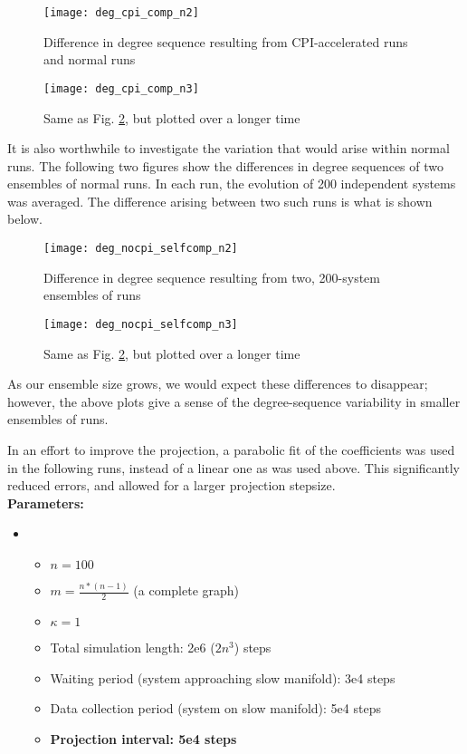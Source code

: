 \documentclass[11pt]{article}
\begin{document}
\begin{figure}[!h]
  \texttt{[image: deg\_cpi\_comp\_n2]}
  \caption{Difference in degree sequence resulting from CPI-accelerated runs and normal runs}
  \label{fig:degcomp_n2}
\end{figure}

\begin{figure}[!h]
  \texttt{[image: deg\_cpi\_comp\_n3]}
  \caption{Same as Fig. \ref{fig:degcomp_n2}, but plotted over a longer time}
\end{figure}


It is also worthwhile to investigate the variation that would arise within normal runs. The following two figures show the differences in degree sequences of two ensembles of normal runs. In each run, the evolution of 200 independent systems was averaged. The difference arising between two such runs is what is shown below.

\begin{figure}[!h]
  \texttt{[image: deg\_nocpi\_selfcomp\_n2]}
  \caption{Difference in degree sequence resulting from two, 200-system ensembles of runs}
  \label{fig:degcomp_n2}
\end{figure}

\begin{figure}[!h]
  \texttt{[image: deg\_nocpi\_selfcomp\_n3]}
  \caption{Same as Fig. \ref{fig:degcomp_n2}, but plotted over a longer time}
\end{figure}

As our ensemble size grows, we would expect these differences to disappear; however, the above plots give a sense of the degree-sequence variability in smaller ensembles of runs. \\

\clearpage

In an effort to improve the projection, a parabolic fit of the coefficients was used in the following runs, instead of a linear one as was used above. This significantly reduced errors, and allowed for a larger projection stepsize. \\

\textbf{Parameters:}
\begin{itemize}[label=]
\item \begin{itemize}[label=-]
\item $n=100$
  \item $m=\frac{n*(n-1)}{2}$ (a complete graph)
  \item $\kappa=1$
  \item Total simulation length: 2e6 ($2n^3$) steps
  \item Waiting period (system approaching slow manifold): 3e4 steps
  \item Data collection period (system on slow manifold): 5e4 steps
  \item  \textbf{Projection interval: 5e4 steps}
\end{itemize}
\end{itemize}
\end{document}
